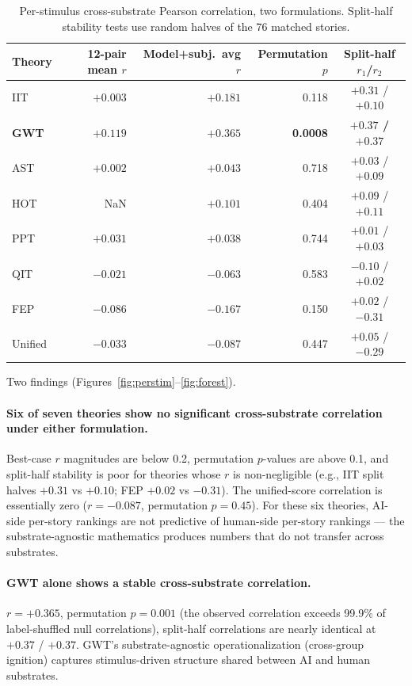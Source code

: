 \documentclass[11pt,a4paper]{article}
\begin{document}
\begin{table}[h]
\centering
\small
\begin{tabular}{lrrrc}
\toprule
\textbf{Theory} & \textbf{12-pair mean $r$} & \textbf{Model+subj.\ avg $r$} & \textbf{Permutation $p$} & \textbf{Split-half $r_1$/$r_2$} \\
\midrule
IIT             & $+0.003$ & $+0.181$ & 0.118 & $+0.31$ / $+0.10$ \\
\textbf{GWT}    & \textbf{$+0.119$} & \textbf{$+0.365$} & \textbf{0.0008} & \textbf{$+0.37$ / $+0.37$} \\
AST             & $+0.002$ & $+0.043$ & 0.718 & $+0.03$ / $+0.09$ \\
HOT             & NaN      & $+0.101$ & 0.404 & $+0.09$ / $+0.11$ \\
PPT             & $+0.031$ & $+0.038$ & 0.744 & $+0.01$ / $+0.03$ \\
QIT             & $-0.021$ & $-0.063$ & 0.583 & $-0.10$ / $+0.02$ \\
FEP             & $-0.086$ & $-0.167$ & 0.150 & $+0.02$ / $-0.31$ \\
Unified         & $-0.033$ & $-0.087$ & 0.447 & $+0.05$ / $-0.29$ \\
\bottomrule
\end{tabular}
\caption{Per-stimulus cross-substrate Pearson correlation, two formulations. Split-half stability tests use random halves of the 76 matched stories.}
\end{table}

Two findings (Figures~\ref{fig:perstim}--\ref{fig:forest}).

\paragraph{Six of seven theories show no significant cross-substrate correlation under either formulation.} Best-case $r$ magnitudes are below 0.2, permutation $p$-values are above 0.1, and split-half stability is poor for theories whose $r$ is non-negligible (e.g., IIT split halves $+0.31$ vs $+0.10$; FEP $+0.02$ vs $-0.31$). The unified-score correlation is essentially zero ($r = -0.087$, permutation $p = 0.45$). For these six theories, AI-side per-story rankings are not predictive of human-side per-story rankings --- the substrate-agnostic mathematics produces numbers that do not transfer across substrates.

\paragraph{GWT alone shows a stable cross-substrate correlation.} $r = +0.365$, permutation $p = 0.001$ (the observed correlation exceeds 99.9\% of label-shuffled null correlations), split-half correlations are nearly identical at $+0.37$ / $+0.37$. GWT's substrate-agnostic operationalization (cross-group ignition) captures stimulus-driven structure shared between AI and human substrates.
\end{document}
